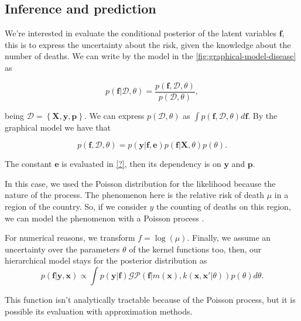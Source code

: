 \subsection{Inference and prediction}

We're interested in evaluate the conditional posterior of the latent variables $\mathbf{f}$, this is to express the uncertainty about the risk, given the knowledge about the number of deaths. We can write by the model in the \autoref{fig:graphical-model-disease} as

\begin{equation}
    p(\mathbf{f}|\mathcal{D},\theta) = \frac{p(\mathbf{f},\mathcal{D},\theta)}{p(\mathcal{D},\theta)},
\end{equation}

being $\mathcal{D}=\left\{ \mathbf{X},\mathbf{y}, \mathbf{p} \right\}$. We can express $p(\mathcal{D},\theta)$ as $\int p(\mathbf{f},\mathcal{D},\theta)d\mathbf{f}$. By the graphical model we have that

\begin{equation}
    p(\mathbf{f},\mathcal{D},\theta) = p(\mathbf{y}|\mathbf{f},\mathbf{e})p(\mathbf{f}|\mathbf{X},\theta)p(\theta).
\end{equation}

The constant $\mathbf{e}$ is evaluated in {\color{red}\ref{?}}, then its dependency is on $\mathbf{y}$ and $\mathbf{p}$.

{\color{red}

In this case, we used the Poisson distribution for the likelihood because the nature of the process. The phenomenon here is the relative risk of death $\mu$ in a region of the country. So, if we consider $y$ the counting of deaths on this region, we can model the phenomenon with a Poisson process \cite{Vanhatalo2010Vehtari}.

For numerical reasons, we transform $f=\log(\mu)$. Finally, we assume an uncertainty over the parameters $\theta$ of the kernel functions too, then, our hierarchical model stays for the posterior distribution as 
%
\begin{equation}
    p(\mathbf{f}|\mathbf{y},\mathbf{x}) \propto \int p(\mathbf{y}|\mathbf{f})\mathcal{GP}\left(\mathbf{f} | m(\mathbf{x}),k(\mathbf{x},\mathbf{x}'|\theta) \right)p(\theta) d\theta.
\end{equation}

This function isn't analytically tractable because of the Poisson process, but it is possible its evaluation with approximation methods.

}
